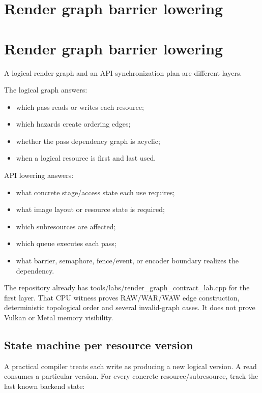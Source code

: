 \hypertarget{appendix-0fc95374cb7e}{}
\section*{Render graph barrier lowering}
\section{Render graph barrier lowering}\label{render-graph-barrier-lowering}

A logical render graph and an API synchronization plan are different layers.

The logical graph answers:

\begin{itemize}
\tightlist
\item
  which pass reads or writes each resource;
\item
  which hazards create ordering edges;
\item
  whether the pass dependency graph is acyclic;
\item
  when a logical resource is first and last used.
\end{itemize}

API lowering answers:

\begin{itemize}
\tightlist
\item
  what concrete stage/access state each use requires;
\item
  what image layout or resource state is required;
\item
  which subresources are affected;
\item
  which queue executes each pass;
\item
  what barrier, semaphore, fence/event, or encoder boundary realizes the dependency.
\end{itemize}

The repository already has tools/labs/render\_graph\_contract\_lab.cpp for the first layer. That CPU witness proves RAW/WAR/WAW edge construction, deterministic topological order and several invalid-graph cases. It does not prove Vulkan or Metal memory visibility.

\subsection{State machine per resource version}\label{state-machine-per-resource-version}

A practical compiler treats each write as producing a new logical version. A read consumes a particular version. For every concrete resource/subresource, track the last known backend state:

